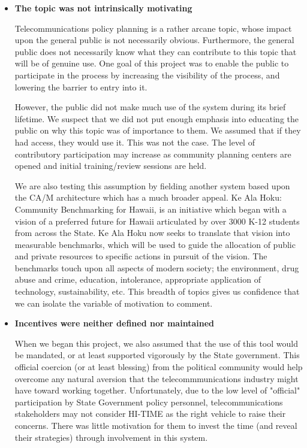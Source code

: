 \begin{itemize}

\item {\bf The topic was not intrinsically motivating}

Telecommunications policy planning is a rather arcane topic, whose impact
upon the general public is not necessarily obvious. Furthermore, the
general public does not necessarily know what they can contribute to
this topic that will be of genuine use.  One goal of this project was to
enable the public to participate in the process by increasing the
visibility of the process, and lowering the barrier to entry into it.

However, the public did not make much use of the system during its brief
lifetime. We suspect that we did not put enough emphasis into educating
the public on why this topic was of importance to them. We assumed that
if they had access, they would use it.  This was not the case.  The level
of contributory participation may increase as community planning centers
are opened and initial training/review sessions are held.

We are also testing this assumption by fielding another system based upon
the CA/M architecture which has a much broader appeal.  Ke Ala Hoku:
Community Benchmarking for Hawaii, is an initiative which began with a
vision of a preferred future for Hawaii articulated by over 3000 K-12
students from across the State.  Ke Ala Hoku now seeks to translate that
vision into measurable benchmarks, which will be used to guide the
allocation of public and private resources to specific actions in pursuit
of the vision.  The benchmarks touch upon all aspects of modern society;
the environment, drug abuse and crime, education, intolerance, appropriate
application of technology, sustainability, etc.  This breadth of topics
gives us confidence that we can isolate the variable of motivation to comment.

\item {\bf Incentives were neither defined nor maintained}

When we began this project, we also assumed that the use of this tool would
be mandated, or at least supported vigorously by the State government.  
This official coercion (or at least blessing) from the political
community would help overcome any natural aversion that the 
telecommmunications industry might have toward working together. 
Unfortunately, due to the low level of "official" participation by State
Government policy personnel, telecommunications stakeholders may not
consider HI-TIME as the right vehicle to raise their concerns. There was little motivation for them
to invest the time (and reveal their strategies) through 
involvement in this system.


\end{itemize}
